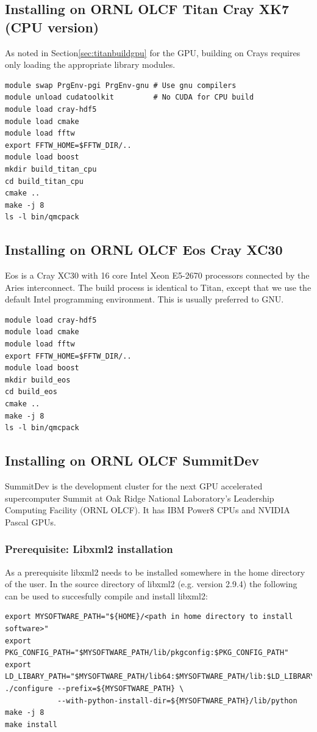 \subsection{Installing on ORNL OLCF Titan Cray XK7 (CPU version)}
As noted in Section\ref{sec:titanbuildgpu} for the GPU, building on
Crays requires only loading the appropriate library modules.

\begin{verbatim}
module swap PrgEnv-pgi PrgEnv-gnu # Use gnu compilers
module unload cudatoolkit         # No CUDA for CPU build
module load cray-hdf5
module load cmake
module load fftw
export FFTW_HOME=$FFTW_DIR/..
module load boost
mkdir build_titan_cpu
cd build_titan_cpu
cmake ..
make -j 8
ls -l bin/qmcpack
\end{verbatim}

\subsection{Installing on ORNL OLCF Eos Cray XC30}
Eos is a Cray XC30 with 16 core Intel Xeon E5-2670 processors connected
by the Aries interconnect. The build process is identical to Titan,
except that we use the default Intel programming environment. This is
usually preferred to GNU.
\begin{verbatim}
module load cray-hdf5
module load cmake
module load fftw
export FFTW_HOME=$FFTW_DIR/..
module load boost
mkdir build_eos
cd build_eos
cmake ..
make -j 8
ls -l bin/qmcpack
\end{verbatim}

\subsection{Installing on ORNL OLCF SummitDev}
SummitDev is the development cluster for the next GPU accelerated
supercomputer Summit at Oak Ridge National Laboratory's
Leadership Computing Facility  (ORNL OLCF). It has IBM Power8 CPUs and NVIDIA Pascal GPUs.

\subsubsection{Prerequisite: Libxml2 installation}
As a prerequisite libxml2 needs to be installed somewhere in the home directory
of the user. In the source directory of libxml2 (e.g. version 2.9.4) the following
can be used to succesfully compile and install libxml2:
\begin{verbatim}
export MYSOFTWARE_PATH="${HOME}/<path in home directory to install software>"
export PKG_CONFIG_PATH="$MYSOFTWARE_PATH/lib/pkgconfig:$PKG_CONFIG_PATH"
export LD_LIBARY_PATH="$MYSOFTWARE_PATH/lib64:$MYSOFTWARE_PATH/lib:$LD_LIBRARY_PATH"
./configure --prefix=${MYSOFTWARE_PATH} \
            --with-python-install-dir=${MYSOFTWARE_PATH}/lib/python
make -j 8
make install
\end{verbatim}

